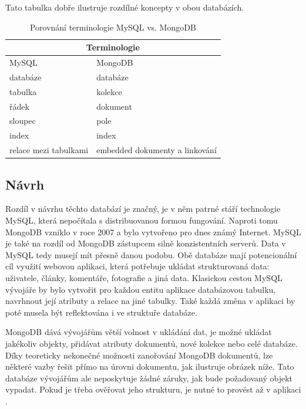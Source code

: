 \vspace{0.25cm}
\noindent Tato tabulka dobře ilustruje rozdílné koncepty v obou databázích.
\begin{table}[h]
\centering
	\caption{Porovnání terminologie MySQL vs. MongoDB \cite{mongoMySQLMapChart}}
    \begin{tabular}{ |p{7cm}|p{7cm}| }
    \hline
    \multicolumn{2}{|c|}{Terminologie} \\ \hline
    MySQL & MongoDB \\ \hline
	databáze & databáze \\	
	tabulka & kolekce \\
	řádek & dokument \\
	sloupec & pole \\
	index & index \\
	relace mezi tabulkami & embedded dokumenty a linkování \\ \hline
    \end{tabular}
    \label{tab:porovnaniTerminologie}
\end{table}

\FloatBarrier
\subsection{Návrh}
Rozdíl v návrhu těchto databází je značný, je v něm patrné stáří technologie MySQL, která nepočítala s distribuovanou formou fungování. Naproti tomu MongoDB vzniklo v roce 2007 a bylo vytvořeno pro dnes známý Internet. MySQL je také na rozdíl od MongoDB zástupcem silně konzistentních serverů. Data v MySQL tedy musejí mít přesně danou podobu. Obě databáze mají potencionální cíl využití webovou aplikaci, která potřebuje ukládat strukturovaná data: uživatele, články, komentáře, fotografie a jiná data. Klasickou cestou MySQL vývojáře by bylo vytvořit pro každou entitu aplikace databázovou tabulku, navrhnout její atributy a relace na jiné tabulky. Také každá změna v aplikaci by poté musela být reflektována i ve struktuře databáze. 

MongoDB dává vývojářům větší volnost v ukládání dat, je možné ukládat jakékoliv objekty, přidávat atributy dokumentů, nové kolekce nebo celé databáze. Díky teoreticky nekonečné možnosti zanořování MongoDB dokumentů, lze některé vazby řešit přímo na úrovni dokumentu, jak ilustruje obrázek níže. Tato databáze vývojářům ale neposkytuje žádné záruky, jak bude požadovaný objekt vypadat. Pokud je třeba ověřovat jeho strukturu, je nutné to provést až v aplikaci \cite{mongoDocs}.

